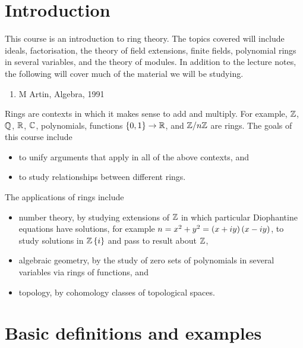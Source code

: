 \def\module{M3P8 Algebra III}
\def\lecturer{Dr David Helm}
\def\term{Autumn 2018}

\def\thm{subsection}








\section{Introduction}

This course is an introduction to ring theory. The topics covered will include ideals, factorisation, the theory of field extensions, finite fields, polynomial rings in several variables, and the theory of modules. In addition to the lecture notes, the following will cover much of the material we will be studying.

\begin{enumerate}
\item M Artin, Algebra, 1991
\end{enumerate}

Rings are contexts in which it makes sense to add and multiply. For example, $ \mathbb{Z} $, $ \mathbb{Q} $, $ \mathbb{R} $, $ \mathbb{C} $, polynomials, functions $ \left\{ 0, 1 \right\} \to \mathbb{R} $, and $ \mathbb{Z} / n\mathbb{Z} $ are rings. The goals of this course include
\begin{itemize}
\item to unify arguments that apply in all of the above contexts, and
\item to study relationships between different rings.
\end{itemize}
The applications of rings include
\begin{itemize}
\item number theory, by studying extensions of $ \mathbb{Z} $ in which particular Diophantine equations have solutions, for example $ n = x^2 + y^2 = \left( x + iy \right)\left( x - iy \right) $, to study solutions in $ \mathbb{Z}\left\{ i \right\} $ and pass to result about $ \mathbb{Z} $,
\item algebraic geometry, by the study of zero sets of polynomials in several variables via rings of functions, and
\item topology, by cohomology classes of topological spaces.
\end{itemize}

\pagebreak

\section{Basic definitions and examples}


